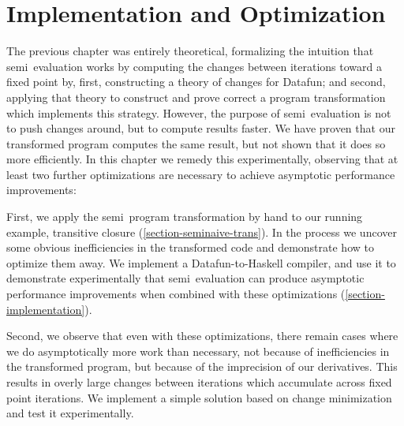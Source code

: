 \chapter{Implementation and Optimization}

\newcommand\deep{\mathvar{dp}}

The previous chapter was entirely theoretical, formalizing the intuition that
semi\naive\ evaluation works by computing the changes between iterations toward
a fixed point by, first, constructing a theory of changes for Datafun; and
second, applying that theory to construct and prove correct a program
transformation which implements this strategy. However, the purpose of
semi\naive\ evaluation is not to push changes around, but to compute results
faster. We have proven that our transformed program computes the same result,
but not shown that it does so more efficiently.
%
In this chapter we remedy this experimentally, observing that at least two
further optimizations are necessary to achieve asymptotic performance
improvements:


First, we apply the semi\naive\ program transformation by hand to our running
example, transitive closure (\cref{section-seminaive-trans}).
%
In the process we uncover some obvious inefficiencies in the transformed code
and demonstrate how to optimize them away.
%
We implement a Datafun-to-Haskell compiler, and use it to demonstrate
experimentally that semi\naive\ evaluation can produce asymptotic performance
improvements when combined with these optimizations (\cref{section-implementation}).

Second, we observe that even with these optimizations, there remain
cases where we do asymptotically more work than necessary, not because of
inefficiencies in the transformed program, but because of the imprecision of our
derivatives. This results in overly large changes between iterations which
accumulate across fixed point iterations. We implement a
simple solution based on change minimization and test it experimentally.





